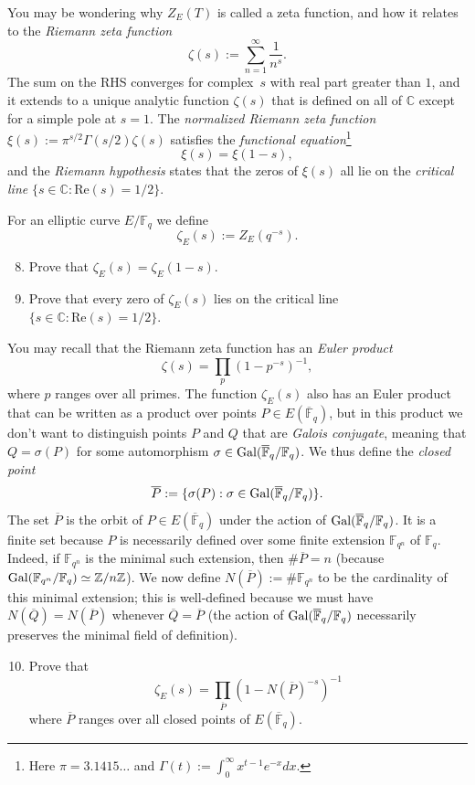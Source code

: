 \documentclass[11pt]{article}
\newcommand{\Fq}{\mathbb{F}_q}
\newcommand{\Fqbar}{\overline{\mathbb{F}}_q}
\newcommand{\F}{\mathbb{F}}
\newcommand{\C}{\mathbb{C}}
\newcommand{\Z}{\mathbb{Z}}
\newcommand{\Gal}{{\rm Gal}}
\begin{document}
You may be wondering why $Z_E(T)$ is called a zeta function, and how it relates to the \emph{Riemann zeta function}
\[
\zeta(s) := \sum_{n=1}^\infty\frac{1}{n^s}.
\]
The sum on the RHS converges for complex~$s$ with real part greater than $1$, and it extends to a unique analytic function $\zeta(s)$ that is defined on all of $\C$ except for a simple pole at $s=1$.
The \emph{normalized Riemann zeta function} $\xi(s):=\pi^{s/2}\Gamma(s/2)\zeta(s)$ satisfies the \emph{functional equation}\footnote{Here $\pi=3.1415\ldots$ and $\Gamma(t):= \int_0^\infty x^{t-1}e^{-x}dx$.}
\[
\xi(s) = \xi(1-s),
\]
and the \emph{Riemann hypothesis} states that the zeros of $\xi(s)$ all lie on the \emph{critical line} $\{s\in \C:\mathrm{Re}(s)=1/2\}$.

For an elliptic curve $E/\Fq$ we define
\[
\zeta_E(s) := Z_E(q^{-s}).
\]

\begin{enumerate}[{\bf (a)}]
\setcounter{enumi}{7}
\item Prove that $\zeta_E(s)=\zeta_E(1-s)$.
\item Prove that every zero of $\zeta_E(s)$ lies on the critical line $\{s\in \C:\mathrm{Re}(s)=1/2\}$.
\end{enumerate}
\noindent

You may recall that the Riemann zeta function has an \emph{Euler product}
\[
\zeta(s)=\prod_p\left(1-p^{-s}\right)^{-1},
\]
where $p$ ranges over all primes.
The function $\zeta_E(s)$ also has an Euler product that can be written as a product over points $P\in E(\Fqbar)$, but in this product we don't want to distinguish points $P$ and $Q$ that are \emph{Galois conjugate}, meaning that $Q=\sigma(P)$ for some automorphism $\sigma\in \Gal(\Fqbar/\Fq)$.
We thus define the \emph{closed point}
\[
\overline{P}:=\{\sigma(P):\sigma\in \Gal(\Fqbar/\Fq)\}.
\]
The set $\overline{P}$ is the orbit of $P\in E(\Fqbar)$ under the action of $\Gal(\Fqbar/\Fq)$.
It is a finite set because $P$ is necessarily defined over some finite extension $\F_{q^n}$ of $\Fq$.
Indeed, if $\F_{q^n}$ is the minimal such extension, then $\#\overline{P}=n$ (because $\Gal(\F_{q^n}/\Fq)\simeq \Z/n\Z$).
We now define $N(\overline{P}):=\#\F_{q^n}$ to be the cardinality of this minimal extension; this is well-defined because we must have $N(\overline{Q})=N(\overline{P})$ whenever $\overline{Q}=\overline{P}$ (the action of $\Gal(\Fqbar/\Fq)$ necessarily preserves the minimal field of definition).

\begin{enumerate}[{\bf (a)}]
\setcounter{enumi}{9}
\item Prove that
\[
\zeta_E(s) = \prod_{\overline{P}}\left(1-N(\overline{P})^{-s}\right)^{-1}
\]
where $\overline{P}$ ranges over all closed points of $E(\Fqbar)$.
\end{enumerate}
\end{document}
